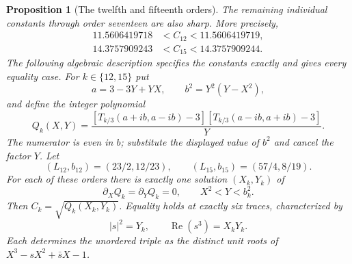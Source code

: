 \documentclass[UTF8,11pt]{ctexart}
\newtheorem{prop}[thm]{Proposition}
\theoremstyle{definition}
\numberwithin{equation}{section}
\DeclareMathOperator{\Rea}{Re}\DeclareMathOperator{\Ima}{Im}
\begin{document}
\begin{prop}[The twelfth and fifteenth orders]
\label{v35:prop:power1215}
The remaining individual constants through order seventeen are also
sharp. More precisely,
\begin{align}
 11.5606419718&<C_{12}<11.5606419719,\label{v35:eq:c12}\\
 14.3757909243&<C_{15}<14.3757909244.\label{v35:eq:c15}
\end{align}
The following algebraic description specifies the constants exactly
and gives every equality case. For $k\in\{12,15\}$ put
\[
 a=3-3Y+YX,\qquad b^2=Y^2(Y-X^2),
\]
and define the integer polynomial
\begin{equation}\label{v35:eq:q}
 Q_k(X,Y)=\frac{
 [T_{k/3}(a+ib,a-ib)-3]
 [T_{k/3}(a-ib,a+ib)-3]}Y.
\end{equation}
The numerator is even in $b$; substitute the displayed value of
$b^2$ and cancel the factor $Y$. Let
\[
 (L_{12},b_{12})=(23/2,12/23),\qquad
 (L_{15},b_{15})=(57/4,8/19).
\]
For each of these orders there is exactly one solution
$(X_k,Y_k)$ of
\begin{equation}\label{v35:eq:critical}
 \partial_XQ_k=\partial_YQ_k=0,
 \qquad X^2<Y<b_k^2.
\end{equation}
Then $C_k=\sqrt{Q_k(X_k,Y_k)}$. Equality holds at exactly
six traces, characterized by
\begin{equation}\label{v35:eq:equality}
                    |s|^2=Y_k,\qquad \Rea(s^3)=X_kY_k.
\end{equation}
Each determines the unordered triple as the distinct unit roots
of $X^3-sX^2+\bar sX-1$.
\end{prop}
\end{document}
